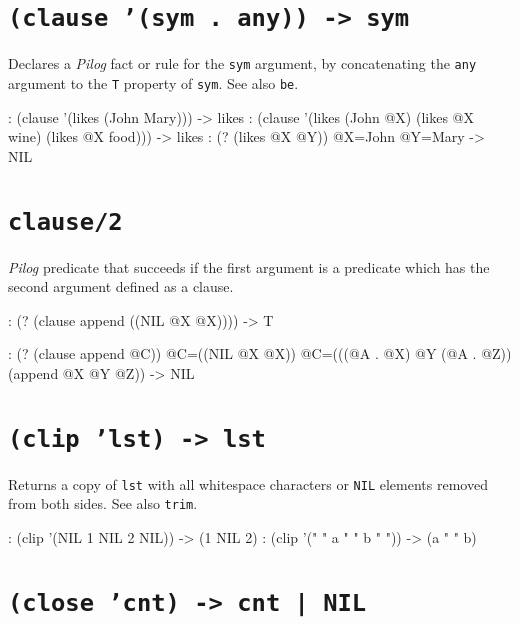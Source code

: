  
\section*{\texttt{(clause '(sym . any)) -> sym}}
\label{sec:funct-rec-C-(clause-'(sym-.-any))-->-sym}


Declares a \emph{Pilog} fact or rule for the \texttt{sym}
argument, by concatenating the \texttt{any} argument to the \texttt{T} property of
\texttt{sym}. See also \texttt{be}.


\begin{wideverbatim}
: (clause '(likes (John Mary)))
-> likes
: (clause '(likes (John @X) (likes @X wine) (likes @X food)))
-> likes
: (? (likes @X @Y))
 @X=John @Y=Mary
-> NIL
\end{wideverbatim}

 
\section*{\texttt{clause/2}}
\label{sec:funct-rec-C-clause/2}


\emph{Pilog} predicate that succeeds if the first argument
is a predicate which has the second argument defined as a clause.


\begin{wideverbatim}
: (? (clause append ((NIL @X @X))))
-> T

: (? (clause append @C))
 @C=((NIL @X @X))
 @C=(((@A . @X) @Y (@A . @Z)) (append @X @Y @Z))
-> NIL
\end{wideverbatim}

 
\section*{\texttt{(clip 'lst) -> lst}}
\label{sec:funct-rec-C-(clip-'lst)-->-lst}


Returns a copy of \texttt{lst} with all whitespace characters or \texttt{NIL} elements
removed from both sides. See also \texttt{trim}.


\begin{wideverbatim}
: (clip '(NIL 1 NIL 2 NIL))
-> (1 NIL 2)
: (clip '(" " a " " b " "))
-> (a " " b)
\end{wideverbatim}

 
\section*{\texttt{(close 'cnt) -> cnt | NIL}}
\label{sec:funct-rec-C-(close-'cnt)-->-cnt-|-nil}


